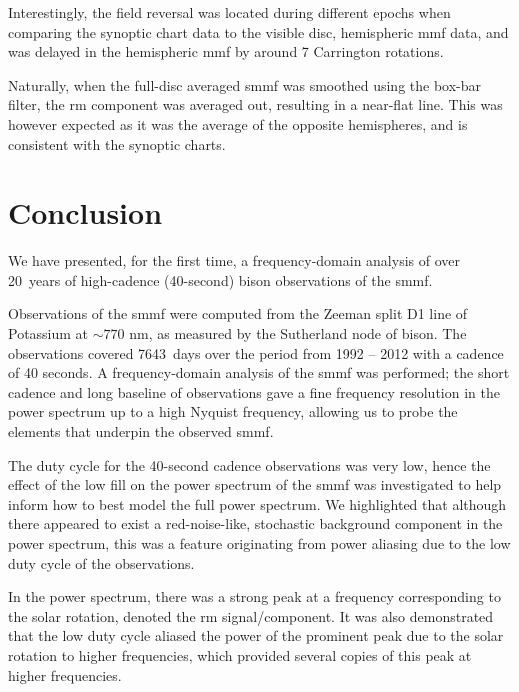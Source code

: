 Interestingly, the field reversal was located during different epochs when comparing the synoptic chart data to the visible disc, hemispheric \gls{mmf} data, and was delayed in the hemispheric \gls{mmf} by around 7 Carrington rotations.

Naturally, when the full-disc averaged \gls{smmf} was smoothed using the box-bar filter, the \gls{rm} component was averaged out, resulting in a near-flat line. This was however expected as it was the average of the opposite hemispheres, and is consistent with the synoptic charts.


\section{Conclusion}\label{sec:SMMF_conclusion}

We have presented, for the first time, a frequency-domain analysis of over 20~years of high-cadence (40-second) \gls{bison} observations of the \gls{smmf}.

Observations of the \gls{smmf} were computed from the Zeeman split D1 line of Potassium at $\sim 770$ nm, as measured by the Sutherland node of \gls{bison}. The observations covered 7643~days over the period from 1992 -- 2012 with a cadence of 40 seconds. A frequency-domain analysis of the \gls{smmf} was performed; the short cadence and long baseline of observations gave a fine frequency resolution in the power spectrum up to a high Nyquist frequency, allowing us to probe the elements that underpin the observed \gls{smmf}.

The duty cycle for the 40-second cadence observations was very low, hence the effect of the low fill on the power spectrum of the \gls{smmf} was investigated to help inform how to best model the full power spectrum. We highlighted that although there appeared to exist a red-noise-like, stochastic background component in the power spectrum, this was a feature originating from power aliasing due to the low duty cycle of the observations.

In the power spectrum, there was a strong peak at a frequency corresponding to the solar rotation, denoted the \gls{rm} signal/component. It was also demonstrated that the low duty cycle aliased the power of the prominent peak due to the solar rotation to higher frequencies, which provided several copies of this peak at higher frequencies.

